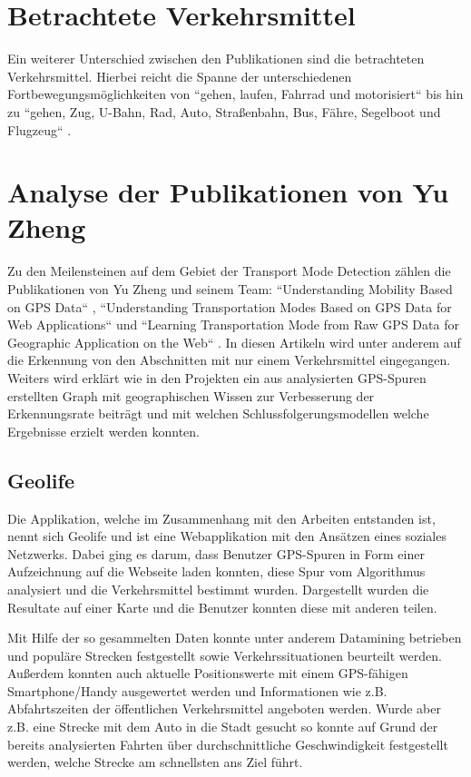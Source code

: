 \section{Betrachtete Verkehrsmittel}
Ein weiterer Unterschied zwischen den Publikationen sind die betrachteten Verkehrsmittel. Hierbei reicht die Spanne der unterschiedenen Fortbewegungsmöglichkeiten von ``gehen, laufen, Fahrrad und motorisiert`` \cite{reddy_using_2010} bis hin zu ``gehen, Zug, U-Bahn, Rad, Auto, Straßenbahn, Bus, Fähre, Segelboot und Flugzeug`` \cite{biljecki_transportation_2013}.

\section{Analyse der Publikationen von Yu Zheng}
Zu den Meilensteinen auf dem Gebiet der Transport Mode Detection zählen die Publikationen von Yu Zheng und seinem Team: ``Understanding Mobility Based on GPS Data`` \cite{zheng_understanding_2008}, ``Understanding Transportation Modes Based on GPS Data for Web Applications`` \cite{zheng_understanding_2010} und ``Learning Transportation Mode from Raw GPS Data for Geographic Application on the Web`` \cite{zheng_learning_2008}. In diesen Artikeln wird unter anderem auf die Erkennung von den Abschnitten mit nur einem Verkehrsmittel eingegangen. Weiters wird erklärt wie in den Projekten ein aus analysierten GPS-Spuren erstellten Graph mit geographischen Wissen zur Verbesserung der Erkennungsrate beiträgt und mit welchen Schlussfolgerungsmodellen welche Ergebnisse erzielt werden konnten. 

\subsection{Geolife}
Die Applikation, welche im Zusammenhang mit den Arbeiten entstanden ist, nennt sich Geolife und ist eine Webapplikation mit den Ansätzen eines soziales Netzwerks. Dabei ging es darum, dass Benutzer GPS-Spuren in Form einer Aufzeichnung auf die Webseite laden konnten, diese Spur vom Algorithmus analysiert und die Verkehrsmittel bestimmt wurden. Dargestellt wurden die Resultate auf einer Karte und die Benutzer konnten diese mit anderen teilen.

Mit Hilfe der so gesammelten Daten konnte unter anderem Datamining betrieben und populäre Strecken festgestellt sowie Verkehrssituationen beurteilt werden. Außerdem konnten auch aktuelle Positionswerte mit einem GPS-fähigen Smartphone/Handy ausgewertet werden und Informationen wie z.B. Abfahrtszeiten der öffentlichen Verkehrsmittel angeboten werden. Wurde aber z.B. eine Strecke mit dem Auto in die Stadt gesucht so konnte auf Grund der bereits analysierten Fahrten über durchschnittliche Geschwindigkeit festgestellt werden, welche Strecke am schnellsten ans Ziel führt.

